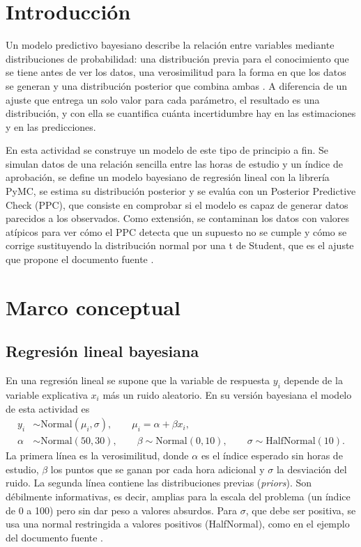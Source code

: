 \documentclass[11pt,letterpaper]{article}
\begin{document}
\portada
\indicegeneral


\section{Introducción}

Un modelo predictivo bayesiano describe la relación entre variables mediante distribuciones de probabilidad: una distribución previa para el conocimiento que se tiene antes de ver los datos, una verosimilitud para la forma en que los datos se generan y una distribución posterior que combina ambas \parencite{tecnm2026_documento_fuente}. A diferencia de un ajuste que entrega un solo valor para cada parámetro, el resultado es una distribución, y con ella se cuantifica cuánta incertidumbre hay en las estimaciones y en las predicciones.

En esta actividad se construye un modelo de este tipo de principio a fin. Se simulan datos de una relación sencilla entre las horas de estudio y un índice de aprobación, se define un modelo bayesiano de regresión lineal con la librería PyMC, se estima su distribución posterior y se evalúa con un Posterior Predictive Check (PPC), que consiste en comprobar si el modelo es capaz de generar datos parecidos a los observados. Como extensión, se contaminan los datos con valores atípicos para ver cómo el PPC detecta que un supuesto no se cumple y cómo se corrige sustituyendo la distribución normal por una t de Student, que es el ajuste que propone el documento fuente \parencite{tecnm2026_documento_fuente}.

\section{Marco conceptual}

\subsection{Regresión lineal bayesiana}

En una regresión lineal se supone que la variable de respuesta $y_i$ depende de la variable explicativa $x_i$ más un ruido aleatorio. En su versión bayesiana el modelo de esta actividad es
\begin{align}
y_i &\sim \mathrm{Normal}(\mu_i, \sigma), \qquad \mu_i = \alpha + \beta x_i , \\
\alpha &\sim \mathrm{Normal}(50, 30), \qquad \beta \sim \mathrm{Normal}(0, 10), \qquad \sigma \sim \mathrm{HalfNormal}(10).
\end{align}
La primera línea es la verosimilitud, donde $\alpha$ es el índice esperado sin horas de estudio, $\beta$ los puntos que se ganan por cada hora adicional y $\sigma$ la desviación del ruido. La segunda línea contiene las distribuciones previas (\textit{priors}). Son débilmente informativas, es decir, amplias para la escala del problema (un índice de 0 a 100) pero sin dar peso a valores absurdos. Para $\sigma$, que debe ser positiva, se usa una normal restringida a valores positivos (HalfNormal), como en el ejemplo del documento fuente \parencite{tecnm2026_documento_fuente}.
\end{document}

